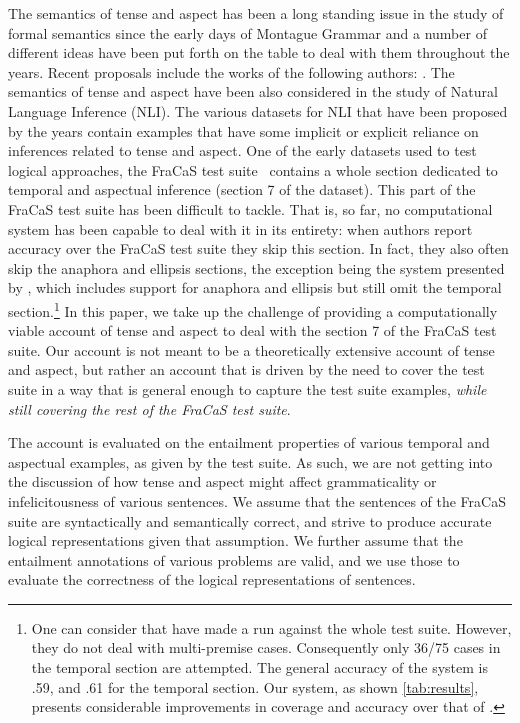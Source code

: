 \documentclass[a4paper,twoside]{article}
\begin{document}
The semantics of tense and aspect has been a long standing issue in
the study of formal semantics since the early days of Montague Grammar
and a number of different ideas have been put forth on the table to
deal with them throughout the years. Recent proposals include the
works of the following authors:
\citet{dowty:2012,prior:2003,steedman_productions_2000,higginbotham:2009,fernando:2015}.
%
The
semantics of tense and aspect have been also considered in the study of
Natural Language Inference (NLI). The various datasets
for NLI that have been proposed by the years contain examples that
have some implicit or explicit reliance on inferences related to tense
and aspect. One of the early datasets used to test logical approaches,
the FraCaS test suite~\citep{cooper:1996} contains a whole section
dedicated to temporal and aspectual inference (section 7 of the dataset). This part
of the FraCaS test suite has been difficult to tackle. That is,
so far, no computational system has been capable to deal with it in its entirety: when
authors report accuracy over the FraCaS test suite they
skip this section.
%
In fact, they also often skip the anaphora and ellipsis sections, the
exception being the system presented by
\citet{bernardy_type-theoretical_2017,bernardy_wide-coverage_2019},
which includes support for anaphora and ellipsis but still omit the
temporal section.\footnote{One can consider that \citet{maccartney:2007} have made a run against the whole test suite. However, they do not deal with multi-premise cases. Consequently only 36/75 cases in the temporal section are attempted. The general accuracy of the system is .59, and .61 for the temporal section. Our system, as shown \cref{tab:results}, presents considerable improvements in coverage and accuracy over that of \citeauthor{maccartney:2007}.}
%
In this paper, we take up the challenge of providing a
computationally viable account of tense and aspect to deal with the
  section 7 of the FraCaS test suite. Our account is not meant
to be a theoretically extensive account of tense and aspect, but rather an
account that is driven by the need to cover the test suite in a way
that is general enough to capture the test suite examples, \emph{while still covering the rest of the FraCaS test suite}.
%

The account is evaluated on the entailment properties of various
temporal and aspectual examples, as given by the test suite. As such,
we are not getting into the discussion of how tense and aspect might
affect grammaticality or infelicitousness of various sentences.
We assume that the sentences of the FraCaS suite are syntactically and
semantically correct, and strive to produce accurate logical
representations given that assumption. We further assume that the
entailment annotations of various problems are valid, and we use those
to evaluate the correctness of the logical representations of
sentences.
\end{document}
